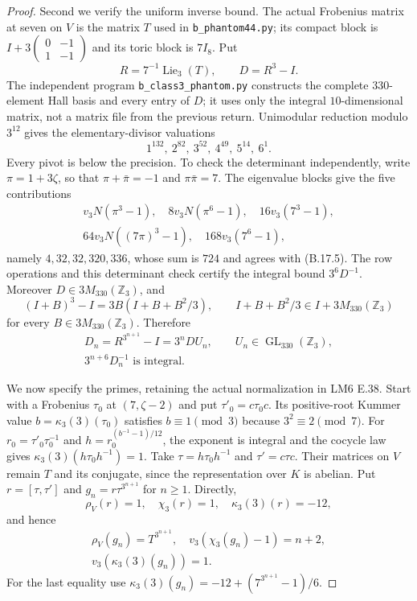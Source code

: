 \begin{proof}
Second we verify the uniform inverse bound. The actual
Frobenius matrix at seven on $V$ is the matrix $T$ used in
\texttt{b\_phantom44.py}; its compact block is
$I+3\left(\begin{smallmatrix}0&-1\\1&-1\end{smallmatrix}\right)$
and its toric block is $7I_8$. Put
\[
       R=7^{-1}\operatorname{Lie}_3(T),\qquad D=R^3-I.
\]
The independent program \texttt{b\_class3\_phantom.py}
constructs the complete $330$-element Hall basis and every
entry of $D$; it uses only the integral $10$-dimensional
matrix, not a matrix file from the previous return. Unimodular
reduction modulo $3^{12}$ gives the elementary-divisor
valuations
\[
                   1^{132},\ 2^{82},\ 3^{52},\
                   4^{49},\ 5^{14},\ 6^1.                     \tag{B.17.5}
\]
Every pivot is below the precision. To check the determinant
independently, write $\pi=1+3\zeta$, so that
$\pi+\bar\pi=-1$ and $\pi\bar\pi=7$. The eigenvalue blocks
give the five contributions
\[
\begin{gathered}
 v_3N(\pi^3-1),\quad 8v_3N(\pi^6-1),\quad16v_3(7^3-1),\\
 64v_3N((7\pi)^3-1),\quad168v_3(7^6-1),
\end{gathered}
\]
namely $4,32,32,320,336$, whose sum is $724$ and agrees
with (B.17.5). The row operations and this determinant check
certify the integral bound $3^6D^{-1}$. Moreover
$D\in3M_{330}(\mathbb Z_3)$, and
\[
 (I+B)^3-I=3B(I+B+B^2/3),\qquad
 I+B+B^2/3\in I+3M_{330}(\mathbb Z_3)
\]
for every $B\in3M_{330}(\mathbb Z_3)$. Therefore
\[
\begin{gathered}
 D_n=R^{3^{n+1}}-I=3^nDU_n,\qquad
 U_n\in\operatorname{GL}_{330}(\mathbb Z_3),\\
                 3^{n+6}D_n^{-1}\text{ is integral}.            \tag{B.17.6}
\end{gathered}
\]

We now specify the primes, retaining the actual normalization
in LM6 E.38. Start with a Frobenius $\tau_0$ at
$(7,\zeta-2)$ and put $\tau'_0=c\tau_0c$. Its positive-root
Kummer value $b=\kappa_3(3)(\tau_0)$ satisfies $b\equiv1\pmod3$
because $3^2\equiv2\pmod7$. For
$r_0=\tau'_0\tau_0^{-1}$ and
$h=r_0^{(b^{-1}-1)/12}$, the exponent is integral and the
cocycle law gives
$\kappa_3(3)(h\tau_0h^{-1})=1$. Take
$\tau=h\tau_0h^{-1}$ and $\tau'=c\tau c$. Their matrices
on $V$ remain $T$ and its conjugate, since the representation
over $K$ is abelian. Put $r=[\tau,\tau']$ and
$g_n=r\tau^{3^{n+1}}$ for $n\geq1$. Directly,
\[
 \rho_V(r)=1,\quad\chi_3(r)=1,\quad\kappa_3(3)(r)=-12,
\]
and hence
\[
\begin{gathered}
 \rho_V(g_n)=T^{3^{n+1}},\quad
 v_3(\chi_3(g_n)-1)=n+2,\\
                 v_3(\kappa_3(3)(g_n))=1.                      \tag{B.17.7}
\end{gathered}
\]
For the last equality use
$\kappa_3(3)(g_n)=-12+(7^{3^{n+1}}-1)/6$.


\end{proof}

